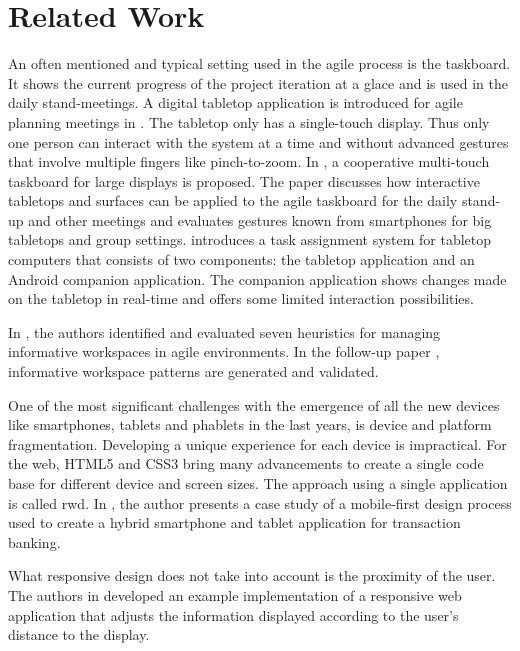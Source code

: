 \documentclass{sigchi}
\begin{document}
\section{Related Work}
An often mentioned and typical setting used in the agile process is the taskboard.
It shows the current progress of the project iteration at a glace and is used in the daily stand-meetings. 
A digital tabletop application is introduced for agile planning meetings in \cite{Ghanam:4599452}. 
The tabletop only has a single-touch display. 
Thus only one person can interact with the system at a time and without advanced gestures that involve multiple fingers like pinch-to-zoom.
In \cite{Rubart:2014:CMS:2669485.2669551}, a cooperative multi-touch taskboard for large displays is proposed. 
The paper discusses how interactive tabletops and surfaces can be applied to the agile taskboard for the daily stand-up and other meetings and evaluates gestures known from smartphones for big tabletops and group settings.
\cite{Haas:2014:TAV:2669485.2669538} introduces a task assignment system for tabletop computers that consists of two components: the tabletop application and an Android companion application.
The companion application shows changes made on the tabletop in real-time and offers some limited interaction possibilities.

In \cite{deMelo:6005497}, the authors identified and evaluated seven heuristics for managing informative workspaces in agile environments.
In the follow-up paper \cite{deMelo:6480421}, informative workspace patterns are generated and validated.

One of the most significant challenges with the emergence of all the new devices like smartphones, tablets and phablets in the last years, is device and platform fragmentation.
Developing a unique experience for each device is impractical.
For the web, HTML5 and CSS3 bring many advancements to create a single code base for different device and screen sizes.
The approach using a single application is called \gls{rwd}.
In \cite{Pandey:2013:RDT:2525194.2525271}, the author presents a case study of a mobile-first design process used to create a hybrid smartphone and tablet application for transaction banking.

What responsive design does not take into account is the proximity of the user. 
The authors in \cite{Sukale:2014:PWD:2638728.2638768} developed an example implementation of a responsive web application that adjusts the information displayed according to the user's distance to the display.
\end{document}

